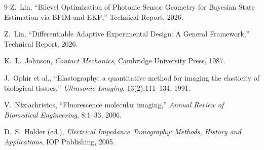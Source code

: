 \documentclass[11pt,a4paper]{article}
\theoremstyle{definition}
\begin{document}
\begin{thebibliography}{9}
 Z.~Lin, ``Bilevel Optimization of Photonic Sensor Geometry for Bayesian State Estimation via BFIM and EKF,'' Technical Report, 2026.

 Z.~Lin, ``Differentiable Adaptive Experimental Design: A General Framework,'' Technical Report, 2026.

 K.~L.~Johnson, \emph{Contact Mechanics}, Cambridge University Press, 1987.

 J.~Ophir et al., ``Elastography: a quantitative method for imaging the elasticity of biological tissues,'' \emph{Ultrasonic Imaging}, 13(2):111--134, 1991.

 V.~Ntziachristos, ``Fluorescence molecular imaging,'' \emph{Annual Review of Biomedical Engineering}, 8:1--33, 2006.

 D.~S.~Holder (ed.), \emph{Electrical Impedance Tomography: Methods, History and Applications}, IOP Publishing, 2005.
\end{thebibliography}
\end{document}
